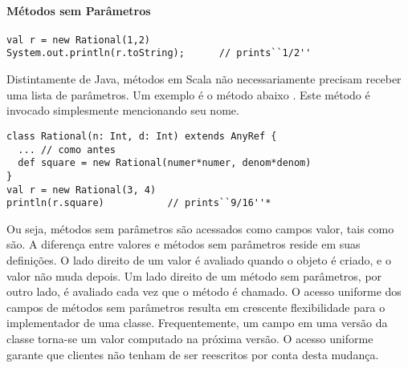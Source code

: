 \paragraph{M\'{e}todos sem Par\^{a}metros}

\begin{lstlisting}
val r = new Rational(1,2)
System.out.println(r.toString);      // prints``1/2''
\end{lstlisting}
Distintamente de Java, m\'{e}todos em Scala n\~{a}o necessariamente precisam 
receber uma lista de par\^{a}metros. Um exemplo \'{e} o m\'{e}todo abaixo .
Este m\'{e}todo \'{e} invocado simplesmente mencionando seu nome. 
\begin{lstlisting}
class Rational(n: Int, d: Int) extends AnyRef {
  ... // como antes
  def square = new Rational(numer*numer, denom*denom)
}
val r = new Rational(3, 4)
println(r.square)           // prints``9/16''*
\end{lstlisting}

Ou seja, m\'{e}todos sem par\^{a}metros s\~{a}o acessados como campos valor, tais como 
 s\~{a}o. A diferen\c{c}a entre valores e m\'{e}todos sem par\^{a}metros 
reside em suas defini\c{c}\~{o}es. O lado direito de um valor \'{e} avaliado quando o 
objeto \'{e} criado, e o valor n\~{a}o muda depois. Um lado direito de um m\'{e}todo sem
par\^{a}metros, por outro lado, \'{e} avaliado cada vez que o m\'{e}todo \'{e} chamado. O 
acesso uniforme dos campos de m\'{e}todos sem par\^{a}metros resulta em crescente
flexibilidade para o implementador de uma classe. Frequentemente, um campo
em uma vers\~{a}o da classe torna-se um valor computado na pr\'{o}xima vers\~{a}o. 
O acesso uniforme garante que clientes n\~{a}o tenham de ser reescritos 
por conta desta mudan\c{c}a.

